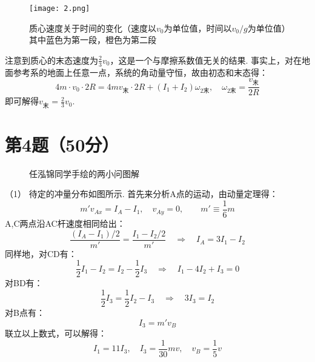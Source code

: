 \documentclass{ctexart}
\begin{document}
\begin{figure}[H]
  \centering
  \texttt{[image: 2.png]}
\caption*{质心速度关于时间的变化（速度以$v_0$为单位值，时间以$v_0/g$为单位值）其中蓝色为第一段，橙色为第二段}
\end{figure}

注意到质心的末态速度为$\frac{2}{3}v_0$，这是一个与摩擦系数值无关的结果. 事实上，对在地面参考系的地面上任意一点，系统的角动量守恒，故由初态和末态得：
\begin{equation}
4m \cdot v_0\cdot 2R=4mv_{\text{末}}\cdot 2R+(I_1+I_2)\omega_{2\text{末}},\quad \omega_{2\text{末}}=\frac{v_{\text{末}}}{2R} \tag{3.28}
\end{equation}
即可解得$v_{\text{末}}=\frac{2}{3}v_0$.

\clearpage
\section*{第4题（50分）}
\begin{figure}[htbp]
  \centering
  \quad    
  \caption*{任泓锦同学手绘的两小问图解}
\end{figure}

\noindent（1）
\noindent 待定的冲量分布如图所示. 首先来分析A点的运动，由动量定理得：
\begin{equation}
   m'v _{Ax}=I_A-I_1,\quad v_{Ay}=0,\qquad m'\equiv \frac{1}{6}m \tag{4.1}
\end{equation}
A,C两点沿AC杆速度相同给出：
\begin{equation}
    \frac{(I_A-I_1)/2}{m'}=\frac{I_1-I_2/2}{m'} \quad \Rightarrow \quad  I_A=3I_1-I_2 \tag{4.2}
\end{equation}
同样地，对CD有：
\begin{equation}
    \frac{1}{2}I_1-I_2=I_2-\frac{1}{2}I_3 \quad \Rightarrow \quad  I_1-4I_2+I_3=0  \tag{4.3}
\end{equation}
对BD有：
\begin{equation}
    \frac{1}{2}I_3=\frac{1}{2}I_2-I_3 \quad \Rightarrow \quad  3I_3=I_2 \tag{4.4}
\end{equation}
对B点有：
\begin{equation}
    I_3=m'v_B \tag{4.5}
\end{equation}
联立以上数式，可以解得：
\begin{equation}
   I_1=11I_3,\quad I_3=\frac{1}{30}mv,\quad v_B=\frac{1}{5}v  \tag{4.6}
\end{equation}
\end{document}
